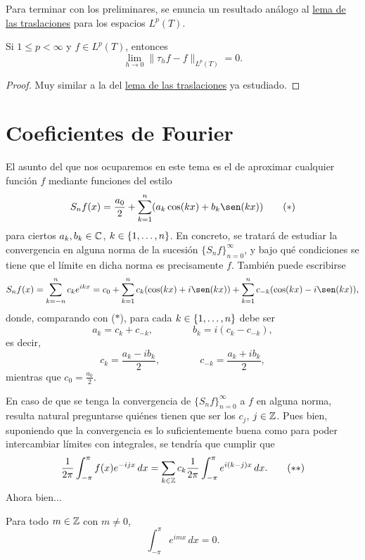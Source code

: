 \documentclass[a4paper, 11pt, oneside]{report}
\begin{document}
Para terminar con los preliminares, se enuncia un resultado análogo al \hyperref[teo:1.11.2]{\color{c1}lema de las traslaciones} para los espacios $L^p(T)$.

\begin{theorem}\label{teo:4.0.4}
    Si $1 \leq p < \infty$ y $f \in L^p(T)$, entonces
  \[\lim_{h \to 0} \|\tau_hf - f\|_{L^p(T)} = 0.\]
\end{theorem}

\begin{proof}
  Muy similar a la del  \hyperref[teo:1.11.2]{\color{c1}lema de las traslaciones} ya estudiado.  
\end{proof}

\section{Coeficientes de Fourier}

El asunto del que nos ocuparemos en este tema es el de aproximar cualquier función $f$ mediante funciones del estilo 
\[S_nf(x) = \frac{a_0}{2}+\sum_{k=1}^n(a_k \cos(kx) + b_k\sen(kx))\tag{$\ast$}\] para ciertos $a_k, b_k \in \mathbb C$, $k \in \{1,\mathellipsis,n\}$. En concreto, se tratará de estudiar la convergencia en alguna norma de la sucesión $\{S_nf\}_{n=0}^\infty$, y bajo qué condiciones se tiene que el límite en dicha norma es precisamente $f$. También puede escribirse
\[S_nf(x) = \sum_{k={-n}}^n c_ke^{ikx} = c_0+\sum_{k=1}^nc_k(\cos(kx)+i\sen(kx)) + \sum_{k=1}^n c_{-k}(\cos(kx)-i\sen(kx)),\]
donde, comparando con ($\ast$), para cada $k \in \{1,\mathellipsis,n\}$ debe ser
\[a_k = c_k + c_{-k}, \qquad \qquad b_k = i(c_k-c_{-k}),\]
es decir,
\[c_k = \frac{a_k-ib_k}{2}, \qquad \qquad c_{-k} = \frac{a_k+ib_k}{2},\]
mientras que $c_0 = \frac{a_0}{2}$. 

En caso de que se tenga la convergencia de $\{S_nf\}_{n=0}^\infty$ a $f$ en alguna norma, resulta natural preguntarse quiénes tienen que ser los $c_j$, $j \in \mathbb Z$. Pues bien, suponiendo que la convergencia es lo suficientemente buena como para poder intercambiar límites con integrales, se tendría que cumplir que
\[\frac{1}{2\pi}\int_{-\pi}^\pi f(x)e^{-ijx} \, dx = \sum_{k \in \mathbb Z} c_k\frac{1}{2\pi}\int_{-\pi}^\pi e^{i(k-j)x} \, dx. \tag{$\ast\ast$}\]
Ahora bien...

\begin{proposition}\label{pro:4.1.1}
  Para todo $m \in \mathbb Z$ con $m \neq 0$,
  \[\int_{-\pi}^\pi e^{imx} \, dx = 0.\]
\end{proposition}
\end{document}
